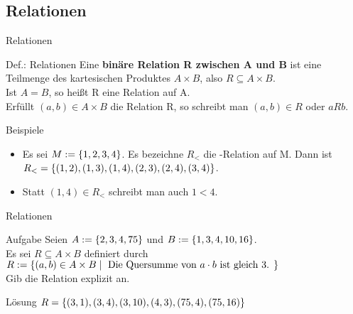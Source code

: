 \subsection{Relationen}
	\begin{frame}{Relationen}
		\begin{block}{Def.: Relationen}
			Eine \textbf{binäre Relation R zwischen A und B} ist eine Teilmenge des kartesischen Produktes $A \times B$, also $R \subseteq A \times B$.\\
			Ist $A=B$, so heißt R eine Relation auf A.\\
			Erfüllt $(a,b) \in A \times B$ die Relation R, so schreibt man $(a,b) \in R$ oder $aRb$.
		\end{block}
	
		\begin{exampleblock}{Beispiele}
			\begin{itemize}
				\item Es sei $M:=\{ 1,2,3,4 \}$. Es bezeichne $R_<$ die -Relation auf M. Dann ist $R_< = \{ (1,2),(1,3),(1,4),(2,3),(2,4),(3,4) \}$.
				\item Statt $(1,4) \in R_<$ schreibt man auch $1 < 4$.
			\end{itemize}
		\end{exampleblock}
	\end{frame}

	\begin{frame}{Relationen}
		\begin{exampleblock}{Aufgabe}
			Seien $A:=\{ 2,3,4,75 \}$ und $B:=\{ 1,3,4,10,16 \}$.\\ 
			Es sei $R \subseteq A \times B $ definiert durch $R:=\{ (a,b) \in A \times B \mid \text{ Die Quersumme von $a \cdot b$ ist gleich 3. } \}$\\
			Gib die Relation explizit an.
		\end{exampleblock}
	\pause
		\begin{block}{Lösung}		
			$R=\{ (3,1),(3,4),(3,10),(4,3),(75,4),(75,16) \}$
		\end{block}
	\end{frame}


\section{}
